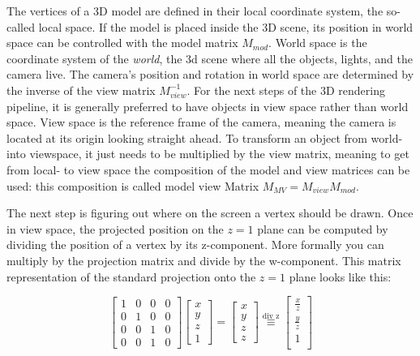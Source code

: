 \documentclass[conference]{IEEEtran}
\begin{document}
The vertices of a 3D model are defined in their local coordinate system, the so-called local space. If the model is placed inside the 3D scene, its position in world space can be controlled with the model matrix $M_{mod}$. World space is the coordinate system of the \textit{world}, the 3d scene where all the objects, lights, and the camera live. The camera's position and rotation in world space are determined by the inverse of the view matrix $M_{view}^{-1}$. For the next steps of the 3D rendering pipeline, it is generally preferred to have objects in view space rather than world space. View space is the reference frame of the camera, meaning the camera is located at its origin looking straight ahead. To transform an object from world- into viewspace, it just needs to be multiplied by the view matrix, meaning to get from local- to view space the composition of the model and view matrices can be used: this composition is called model view Matrix $M_{MV}=M_{view}M_{mod}$.

The next step is figuring out where on the screen a vertex should be drawn. Once in view space, the projected position on the $z = 1$ plane can be computed by dividing the position of a vertex by its z-component. More formally you can multiply by the projection matrix and divide by the w-component. This matrix representation of the standard projection onto the $z = 1$ plane looks like this:

\begin{equation}
    \begin{bmatrix}
        1 & 0 & 0 & 0 \\
        0 & 1 & 0 & 0 \\
        0 & 0 & 1 & 0 \\
        0 & 0 & 1 & 0
    \end{bmatrix}
    \begin{bmatrix}
        x \\
        y \\
        z \\
        1
    \end{bmatrix}
    =
    \begin{bmatrix}
        x \\
        y \\
        z \\
        z
    \end{bmatrix}
    \overset{\text{div z}}{\equiv}
    \begin{bmatrix}
        \frac{x}{z} \\
        \frac{y}{z} \\
        1           \\
    \end{bmatrix}
\end{equation}
\end{document}
